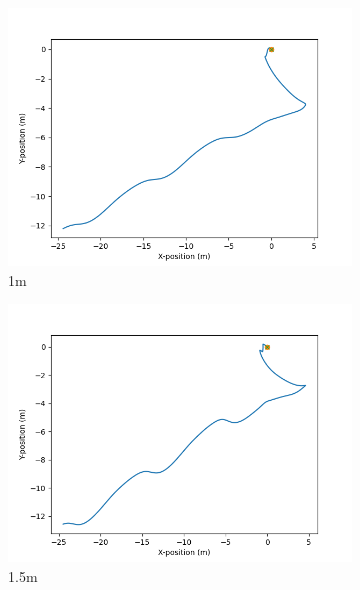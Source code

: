 \documentclass[class=article, crop=false]{standalone}
\begin{document}
\begin{figure}
\begin{subfigure}[b]{0.48\textwidth}
        \includegraphics{scenario1/rov-100m/1.0m/usv_position_uncontrolled}
        \caption{1m}
        \label{}
    \end{subfigure}
    \hfill
    \begin{subfigure}[b]{0.48\textwidth}
        \centering
        \includegraphics{scenario1/rov-100m/1.5m/usv_position_uncontrolled}
        \caption{1.5m}
        \label{}
    \end{subfigure}
    \vfill
    \begin{subfigure}[b]{0.48\textwidth}
        \centering

\end{subfigure}
\end{figure}
\end{document}
